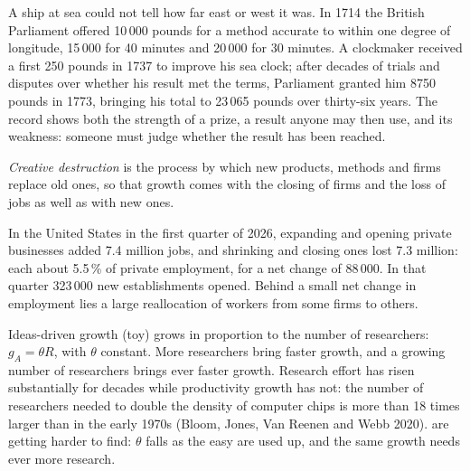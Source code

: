 \begin{record}
A ship at sea could not tell how far east or west it was. In 1714 the British Parliament offered 10\,000 pounds for a method accurate to within one degree of longitude,
15\,000 for 40 minutes and 20\,000 for 30 minutes. A clockmaker received a first 250 pounds in 1737 to improve his sea clock; after decades of trials and
disputes over whether his result met the terms, Parliament granted him 8750 pounds in 1773, bringing his total to 23\,065 pounds over thirty-six years. The record shows
both the strength of a prize, a result anyone may then use, and its weakness: someone must judge whether the result has been reached.
\end{record}

\begin{definition}\label{def:g12:ideas-institutions-growth:creative-destruction}
\emph{Creative destruction} is the process by which new products, methods and firms replace old ones, so that growth comes with the closing of
firms and the loss of jobs as well as with new ones.
\end{definition}

In the United States in the first quarter of 2026, expanding and opening private businesses added 7.4 million jobs, and shrinking and closing ones lost 7.3 million: each
about 5.5\,\% of private employment, for a net change of 88\,000. In that quarter 323\,000 new establishments opened. Behind a small net change in employment lies a large
reallocation of workers from some firms to others.

\begin{model}{Ideas-driven growth (toy)}
\assumes {} grows in proportion to the number of researchers: $g_A = \theta R$, with $\theta$ constant.
\predicts More researchers bring faster growth, and a growing number of researchers brings ever faster growth.
\tested Research effort has risen substantially for decades while productivity growth has not: the number of researchers needed to double the density of computer chips is
  more than 18 times larger than in the early 1970s (Bloom, Jones, Van Reenen and Webb 2020).
\breaks {} are getting harder to find: $\theta$ falls as the easy  are used up, and the same growth needs ever more research.
\end{model}

